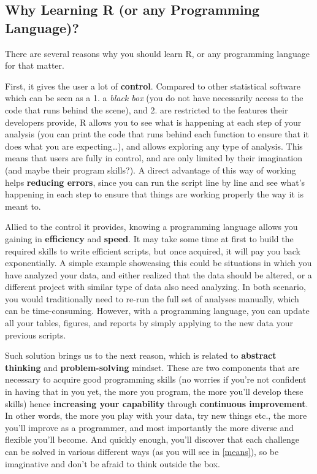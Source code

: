 \documentclass[
]{krantz}
\begin{document}
\hypertarget{why-learning-r-or-any-programming-language}{%
\subsection{Why Learning R (or any Programming Language)?}\label{why-learning-r-or-any-programming-language}}

There are several reasons why you should learn R, or any programming language for that matter.

First, it gives the user a lot of \textbf{control}. Compared to other statistical software which can be seen as a 1. a \emph{black box} (you do not have necessarily access to the code that runs behind the scene), and 2. are restricted to the features their developers provide, R allows you to see what is happening at each step of your analysis (you can print the code that runs behind each function to ensure that it does what you are expecting\ldots), and allows exploring any type of analysis. This means that users are fully in control, and are only limited by their imagination (and maybe their program skills?). A direct advantage of this way of working helps \textbf{reducing errors}, since you can run the script line by line and see what's happening in each step to ensure that things are working properly the way it is meant to.

Allied to the control it provides, knowing a programming language allows you gaining in \textbf{efficiency} and \textbf{speed}. It may take some time at first to build the required skills to write efficient scripts, but once acquired, it will pay you back exponentially. A simple example showcasing this could be situations in which you have analyzed your data, and either realized that the data should be altered, or a different project with similar type of data also need analyzing. In both scenario, you would traditionally need to re-run the full set of analyses manually, which can be time-consuming. However, with a programming language, you can update all your tables, figures, and reports by simply applying to the new data your previous scripts.

Such solution brings us to the next reason, which is related to \textbf{abstract thinking} and \textbf{problem-solving} mindset. These are two components that are necessary to acquire good programming skills (no worries if you're not confident in having that in you yet, the more you program, the more you'll develop these skills) hence \textbf{increasing your capability} through \textbf{continuous improvement}. In other words, the more you play with your data, try new things etc., the more you'll improve as a programmer, and most importantly the more diverse and flexible you'll become. And quickly enough, you'll discover that each challenge can be solved in various different ways (as you will see in \ref{means}), so be imaginative and don't be afraid to think outside the box.
\end{document}
